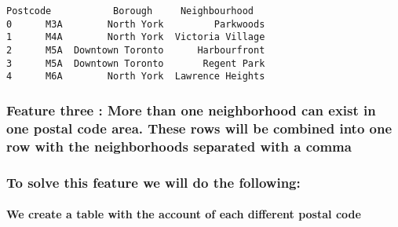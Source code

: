 \documentclass[11pt]{article}
\makeatletter
\newcommand{\boxspacing}{\kern\kvtcb@left@rule\kern\kvtcb@boxsep}
\newcommand{\prompt}[4]{
        \ttfamily\llap{{\color{#2}[#3]:\hspace{3pt}#4}}\vspace{-\baselineskip}
    }
\makeatother
\begin{document}
            \begin{tcolorbox}[breakable, size=fbox, boxrule=.5pt, pad at break*=1mm, opacityfill=0]
\prompt{Out}{outcolor}{136}{\boxspacing}
\begin{Verbatim}[commandchars=\\\{\}]
  Postcode           Borough     Neighbourhood
0      M3A        North York         Parkwoods
1      M4A        North York  Victoria Village
2      M5A  Downtown Toronto      Harbourfront
3      M5A  Downtown Toronto       Regent Park
4      M6A        North York  Lawrence Heights
\end{Verbatim}
\end{tcolorbox}
        
    \hypertarget{feature-three-more-than-one-neighborhood-can-exist-in-one-postal-code-area.-these-rows-will-be-combined-into-one-row-with-the-neighborhoods-separated-with-a-comma}{%
\subsubsection{Feature three : More than one neighborhood can exist in
one postal code area. These rows will be combined into one row with the
neighborhoods separated with a
comma}\label{feature-three-more-than-one-neighborhood-can-exist-in-one-postal-code-area.-these-rows-will-be-combined-into-one-row-with-the-neighborhoods-separated-with-a-comma}}

\hypertarget{to-solve-this-feature-we-will-do-the-following}{%
\subsubsection{To solve this feature we will do the
following:}\label{to-solve-this-feature-we-will-do-the-following}}

\hypertarget{we-create-a-table-with-the-account-of-each-different-postal-code}{%
\paragraph{We create a table with the account of each different postal
code}\label{we-create-a-table-with-the-account-of-each-different-postal-code}}
\end{document}
